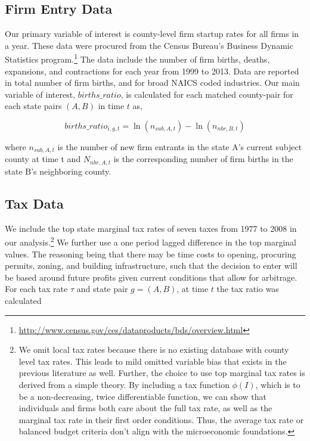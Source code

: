 \subsection{Firm Entry Data}

Our primary variable of interest is county-level firm startup rates for all firms in a year. These data were procured from the Census Bureau’s Business Dynamic Statistics program.\footnote{\url{http://www.census.gov/ces/dataproducts/bds/overview.html}} The data include the number of firm births, deaths, expansions, and contractions for each year from 1999 to 2013. Data are reported in total number of firm births, and for broad NAICS coded industries. Our main variable of interest, $births\_ratio$, is calculated for each matched county-pair for each state pairs $(A, B)$ in time $t$ as, 

\begin{equation} births\_ratio_{i,g,t} = \ln(n_{sub,A,t})-\ln(n_{nbr,B,t})\end{equation}

where $n_{sub,A,t}$ is the number of new firm entrants in the state A's current subject county at time t and  $N_{nbr,A,t}$ is the corresponding number of firm births in the state B's neighboring county.

\subsection{Tax Data}

We include the top state marginal tax rates of seven taxes from 1977 to 2008 in our analysis.\footnote{We omit local tax rates because there is no existing database with county level tax rates. This leads to mild omitted variable bias that exists in the previous literature as well. Further, the choice to use top marginal tax rates is derived from a simple theory. By including a tax function $\phi(I)$, which is to be a non-decreasing, twice differentiable function, we can show that individuals and firms both care about the full tax rate, as well as the marginal tax rate in their first order conditions. Thus, the average tax rate or balanced budget criteria don't align with the microeconomic foundations.} We further use a one period lagged difference in the top marginal values. The reasoning being that there may be time costs to opening, procuring permits, zoning, and building infrastructure, such that the decision to enter will be based around future profits given current conditions that allow for arbitrage. For each tax rate $\tau$ and state pair $g = (A,B)$, at time $t$ the tax ratio was calculated 

